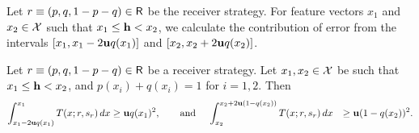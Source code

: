 Let $r \equiv (p,q,1-p-q) \in \mathsf{R}$ be the receiver strategy. For feature vectors $x_1$ and $x_2 \in \mathcal{X}$ such that $x_1 \leq \mathbf{h} < x_2$, we calculate the contribution of error from the intervals $[x_1, x_1 - 2\mathbf{u} q(x_1)]$ and $[x_2, x_2 + 2\mathbf{u} q(x_2)]$.

\begin{lem}\label{lem:conservative estimate of the error outside the delta interval}
    Let $r \equiv (p, q,1-p-q) \in \mathsf{R}$ be a receiver strategy. Let $x_1, x_2 \in \mathcal{X}$ be such that $x_1 \leq \mathbf{h} < x_2$, and $p(x_i) + q(x_i) = 1$ for $i = 1, 2$. Then
    \begin{equation*}
    \begin{aligned}
        \int_{x_1 - 2\mathbf{u} q(x_1)}^{x_1} T(x;r,s_r) \, dx &\geq \mathbf{u} q(x_1)^2, \quad \hbox{\quad and\quad}\;
        \int_{x_2}^{x_2 + 2\mathbf{u}(1-q(x_2))} T(x;r,s_r) \, dx &\geq \mathbf{u} (1-q(x_2))^2.
    \end{aligned}
    \end{equation*}
\end{lem}

